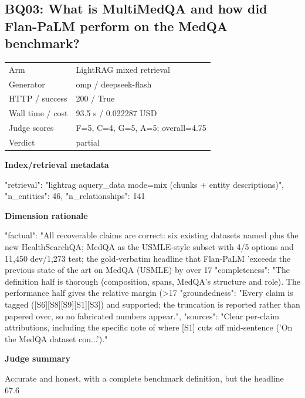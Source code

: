 \documentclass[10pt]{article}
\begin{document}
\subsection{BQ03: What is MultiMedQA and how did Flan-PaLM perform on the MedQA benchmark?}
\begin{tabular}{@{}ll@{}}
Arm & LightRAG mixed retrieval\\
Generator & omp / deepseek-flash\\
HTTP / success & 200 / True\\
Wall time / cost & 93.5 s / 0.022287 USD\\
Judge scores & F=5, C=4, G=5, A=5; overall=4.75\\
Verdict & partial\\
\end{tabular}

\textbf{Index/retrieval metadata}
\begin{EvidenceText}
{
  "retrieval": "lightrag aquery_data mode=mix (chunks + entity descriptions)",
  "n_entities": 46,
  "n_relationships": 141
}
\end{EvidenceText}

\textbf{Dimension rationale}
\begin{EvidenceText}
{
  "factual": "All recoverable claims are correct: six existing datasets named plus the new HealthSearchQA; MedQA as the USMLE-style subset with 4/5 options and 11,450 dev/1,273 test; the gold-verbatim headline that Flan-PaLM 'exceeds the previous state of the art on MedQA (USMLE) by over 17%
  "completeness": "The definition half is thorough (composition, spans, MedQA's structure and role). The performance half gives the relative margin (>17%
  "groundedness": "Every claim is tagged ([S6][S8][S9][S1][S3]) and supported; the truncation is reported rather than papered over, so no fabricated numbers appear.",
  "sources": "Clear per-claim attributions, including the specific note of where [S1] cuts off mid-sentence ('On the MedQA dataset con...')."
}
\end{EvidenceText}

\textbf{Judge summary}
\begin{EvidenceText}
Accurate and honest, with a complete benchmark definition, but the headline 67.6%
\end{EvidenceText}
\end{document}
